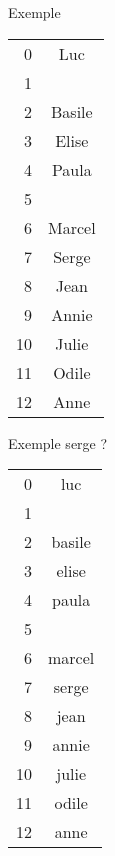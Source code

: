 \documentclass{beamer}
\begin{document}
  \begin{frame}{Exemple}
    \begin{table}[]
\centering
\begin{tabular}{r|c|}
\cline{2-2}
0  & Luc    \\ \cline{2-2}
1  &        \\ \cline{2-2}
2  & Basile \\ \cline{2-2}
3  & Elise                       \\ \cline{2-2}
4  & Paula                       \\ \cline{2-2}
5  &                             \\ \cline{2-2}
6  & Marcel                      \\ \cline{2-2}
7  & Serge                       \\ \cline{2-2}
8  & Jean                        \\ \cline{2-2}
9  & Annie                       \\ \cline{2-2}
10 & Julie                       \\ \cline{2-2}
11 & Odile                       \\ \cline{2-2}
12 & Anne                        \\ \cline{2-2}
\end{tabular}
\end{table}
  \end{frame}

  \begin{frame}{Exemple}
      serge ?
    \begin{table}[]
\centering
\begin{tabular}{r|c|}
\cline{2-2}
0  & luc    \\ \cline{2-2}
1  &        \\ \cline{2-2}
2  & basile \\ \cline{2-2}
3  & elise                       \\ \cline{2-2}
4  & paula                       \\ \cline{2-2}
5  &                             \\ \cline{2-2}
6  & marcel                      \\ \cline{2-2}
7  & serge                       \\ \cline{2-2}
8  & jean                        \\ \cline{2-2}
9  & annie                       \\ \cline{2-2}
10 & julie                       \\ \cline{2-2}
11 & odile                       \\ \cline{2-2}
12 & anne                        \\ \cline{2-2}
\end{tabular}
\end{table}

  \end{frame}
\end{document}
